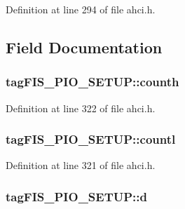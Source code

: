 Definition at line 294 of file ahci.\+h.



\subsection{Field Documentation}
\subsubsection[{\texorpdfstring{counth}{counth}}]{ tag\+F\+I\+S\+\_\+\+P\+I\+O\+\_\+\+S\+E\+T\+U\+P\+::counth}\hypertarget{structtagFIS__PIO__SETUP_a6e011ecbdb7acf1f23c4375dd00ae972}{}\label{structtagFIS__PIO__SETUP_a6e011ecbdb7acf1f23c4375dd00ae972}


Definition at line 322 of file ahci.\+h.

\subsubsection[{\texorpdfstring{countl}{countl}}]{ tag\+F\+I\+S\+\_\+\+P\+I\+O\+\_\+\+S\+E\+T\+U\+P\+::countl}\hypertarget{structtagFIS__PIO__SETUP_a630c3c21d33cd057f165187017d478f2}{}\label{structtagFIS__PIO__SETUP_a630c3c21d33cd057f165187017d478f2}


Definition at line 321 of file ahci.\+h.

\subsubsection[{\texorpdfstring{d}{d}}]{ tag\+F\+I\+S\+\_\+\+P\+I\+O\+\_\+\+S\+E\+T\+U\+P\+::d}\hypertarget{structtagFIS__PIO__SETUP_a7594c820614cf7797657ad47af083bb0}{}\label{structtagFIS__PIO__SETUP_a7594c820614cf7797657ad47af083bb0}


